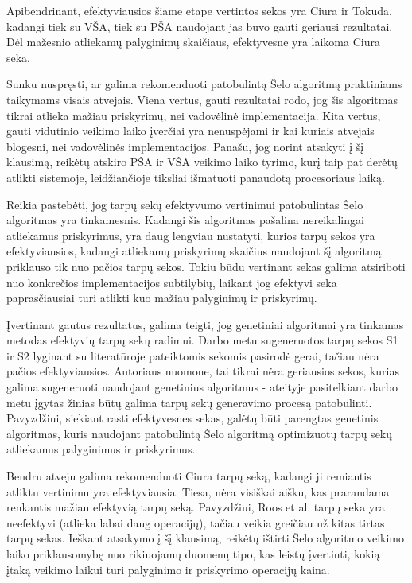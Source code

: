\documentclass{VUMIFInfKursinis}
\begin{document}
Apibendrinant, efektyviausios šiame etape vertintos sekos yra Ciura ir Tokuda, kadangi tiek su VŠA, tiek su PŠA 
naudojant jas buvo gauti geriausi rezultatai.
Dėl mažesnio atliekamų palyginimų skaičiaus, efektyvesne yra laikoma Ciura seka.


Sunku nuspręsti, ar galima rekomenduoti patobulintą Šelo algoritmą praktiniams taikymams visais atvejais. 
Viena vertus, gauti rezultatai rodo, jog šis algoritmas tikrai atlieka mažiau priskyrimų, nei vadovėlinė implementacija.
Kita vertus, gauti vidutinio veikimo laiko įverčiai yra nenuspėjami ir kai kuriais atvejais blogesni, nei vadovėlinės implementacijos.
Panašu, jog norint atsakyti į šį klausimą, reikėtų atskiro PŠA ir VŠA veikimo laiko tyrimo, kurį taip pat derėtų atlikti sistemoje, leidžiančioje tiksliai išmatuoti
panaudotą procesoriaus laiką.

Reikia pastebėti, jog tarpų sekų efektyvumo vertinimui patobulintas Šelo algoritmas yra tinkamesnis.
Kadangi šis algoritmas pašalina nereikalingai atliekamus priskyrimus, yra daug lengviau nustatyti, kurios tarpų sekos yra efektyviausios,
kadangi atliekamų priskyrimų skaičius naudojant šį algoritmą priklauso tik nuo pačios tarpų sekos.
Tokiu būdu vertinant sekas galima atsiriboti nuo konkrečios implementacijos subtilybių, laikant jog efektyvi seka paprasčiausiai turi atlikti kuo mažiau palyginimų ir priskyrimų.

Įvertinant gautus rezultatus, galima teigti, jog genetiniai algoritmai yra tinkamas metodas efektyvių tarpų sekų radimui.
Darbo metu sugeneruotos tarpų sekos S1 ir S2 lyginant su literatūroje pateiktomis sekomis pasirodė gerai, tačiau nėra pačios efektyviausios.
Autoriaus nuomone, tai tikrai nėra geriausios sekos, kurias galima sugeneruoti naudojant genetinius algoritmus - ateityje
pasitelkiant darbo metu įgytas žinias būtų galima tarpų sekų generavimo procesą patobulinti.
Pavyzdžiui, siekiant rasti efektyvesnes sekas, galėtų būti parengtas genetinis algoritmas, kuris naudojant patobulintą Šelo algoritmą
optimizuotų tarpų sekų atliekamus palyginimus ir priskyrimus.

Bendru atveju galima rekomenduoti Ciura tarpų seką, kadangi ji remiantis atliktu vertinimu yra efektyviausia.
Tiesa, nėra visiškai aišku, kas prarandama renkantis mažiau efektyvią tarpų seką.
Pavyzdžiui, Roos et al. tarpų seka yra neefektyvi (atlieka labai daug operacijų), tačiau veikia greičiau už kitas tirtas tarpų sekas.
Ieškant atsakymo į šį klausimą, reikėtų ištirti Šelo algoritmo veikimo laiko priklausomybę nuo rikiuojamų duomenų tipo,
kas leistų įvertinti, kokią įtaką veikimo laikui turi palyginimo ir priskyrimo operacijų kaina.
\end{document}
